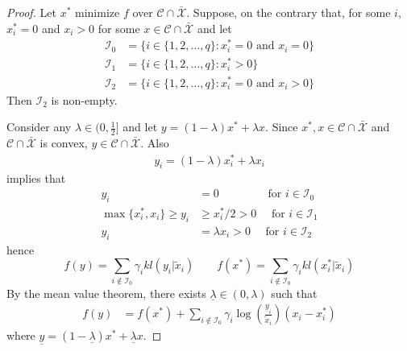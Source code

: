 \documentclass[twocolumn]{article}
\begin{document}
\begin{proof}
Let  $x^*$ minimize 
$f$
over $ {\mathcal C} \cap \bar{\mathcal X}$. 
Suppose, on the contrary that, for some $i$, $x^*_i=0$ and $x_i >0$ for some $x \in {\mathcal C} \cap \bar{\mathcal X}$
 and let 
\begin{align*}
\mathcal {I}_0 &= \{ i \in \{1,2,\dots, q\}: x^*_i =0 \mbox{ and } x_i = 0\}	
\\
\mathcal {I}_1 &= \{ i \in \{1,2,\dots, q\}: x^*_i >0 \}	\\
\mathcal {I}_2 &= \{ i \in \{1,2,\dots, q\}: x^*_i =0 \mbox{ and } x_i >0\}	
\end{align*}
Then $\mathcal {I}_2$ is non-empty.

Consider  any  $\lambda \in (0, \frac{1}{2}]$   and  let $y=(1-\lambda)x^* + \lambda x$.
Since $x^*, x \in   {\mathcal C} \cap \bar {\mathcal X}$ and  ${\mathcal C} \cap \bar {\mathcal X}$ is convex, $y \in {\mathcal C} \cap \bar{\mathcal X}$.
Also
\begin{align*}
y_i = (1-\lambda)x_i^* + \lambda x_i
\end{align*}
implies that
\begin{align}
y_i &= 0 \qquad \qquad \mbox { for } i \in {\mathcal I}_0 \label{eq:ybounds0}\\
 \max\{x^*_i, x_i\} \ge y_i & \ge  x^*_i/2 >0	 \quad  \mbox { for } i \in {\mathcal I}_1	\label{eq:ybounds1}\\
  y_i  & =\lambda x_i>0 \quad  \mbox { for } i \in {\mathcal I}_2 \label{eq:ybounds2}
\end{align}
hence 
\[
f(y) = \sum_{i\notin {\mathcal I}_0}\gamma_i kl(y_i|\tilde{x}_i)\qquad f(x^*) = \sum_{i\notin {\mathcal I}_0}\gamma_i kl(x_i^*|\tilde{x}_i)
\]
By the mean value theorem, there exists  $\underline{\lambda} \in (0, \lambda)$ such that
\begin{align}
f(y)
&=f(x^*) + \sum_{i\notin {\mathcal I}_0}   \gamma_i\log \left( \frac{\underline{y}_i}{\tilde{x}_i }\right)(x_i - x^*_i)  \label{eq:f(T)} 
\end{align}
where $\underline{y} = (1-\underline{\lambda})x^* + \underline{\lambda} x$.
 

\end{proof}
\end{document}
